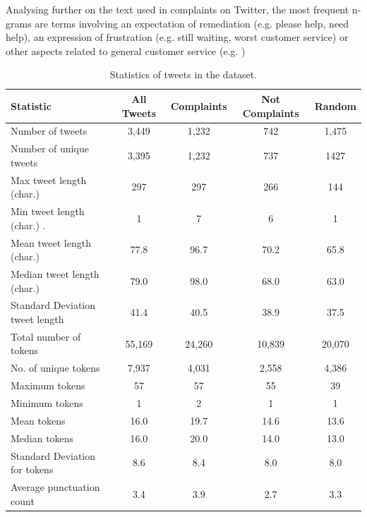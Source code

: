 Analysing further on the text used in complaints on Twitter, the most frequent n-grams are terms involving an expectation of remediation (e.g. please help, need help), an expression of frustration (e.g. still waiting, worst customer service) or other aspects related to general customer service (e.g. )
\begin{table}[htbp]
    \captionsetup{font=small}
    \centering
    \begin{tabularx}{\textwidth}{|X|c|c|c|c|}
        \hline
        \rowcolor[gray]{0.7}
        \textbf{Statistic}                        & \textbf{All Tweets} & \textbf{Complaints} & \textbf{Not Complaints} & \textbf{Random} \\
        \hline
        Number of tweets                 & 3,449      & 1,232      & 742            & 1,475  \\
        \hline
        Number of unique tweets          & 3,395      & 1,232      & 737            & 1427   \\
        \hline
        \hline
        Max tweet length (char.)    & 297        & 297        & 266            & 144    \\
        \hline
        Min tweet length (char.)   .& 1          & 7          & 6              & 1      \\
        \hline
        Mean tweet length (char.)   & 77.8       & 96.7       & 70.2           & 65.8   \\
        \hline
        Median tweet length (char.) & 79.0       & 98.0       & 68.0           & 63.0   \\
        \hline
        Standard Deviation tweet length  & 41.4       & 40.5       & 38.9           & 37.5   \\
        \hline
        \hline
        Total number of tokens           & 55,169     & 24,260     & 10,839         & 20,070 \\
        \hline
        No. of unique tokens             & 7,937      & 4,031      & 2,558          & 4,386  \\
        \hline
        Maximum tokens                   & 57         & 57         & 55             & 39     \\
        \hline
        Minimum tokens                   & 1          & 2          & 1              & 1      \\
        \hline
        Mean tokens                      & 16.0       & 19.7       & 14.6           & 13.6   \\
        \hline
        Median tokens                    & 16.0       & 20.0       & 14.0           & 13.0   \\
        \hline
        Standard Deviation for tokens    & 8.6        & 8.4        & 8.0            & 8.0    \\
        \hline
        \hline
        Average punctuation count        & 3.4        & 3.9        & 2.7            & 3.3    \\
        \hline
    \end{tabularx}
    \caption{Statistics of tweets in the dataset.}
    \label{tab: tweets_statistics}
\end{table}



